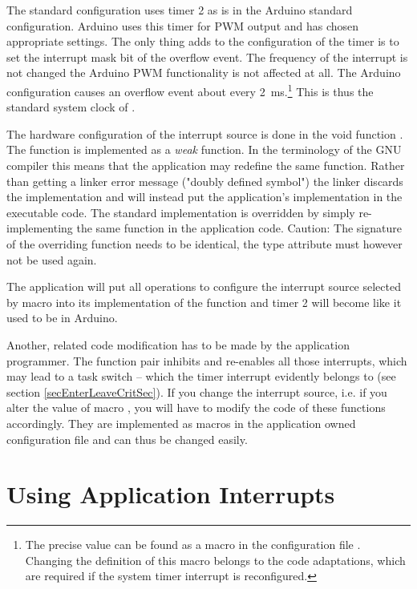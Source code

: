 The \rtos{} standard configuration uses timer 2 as is in the Arduino
standard configuration. Arduino uses this timer for PWM output and has
chosen appropriate settings. The only thing \rtos{} adds to the
configuration of the timer is to set the interrupt mask bit of the
overflow event. The frequency of the interrupt is not changed the Arduino
PWM functionality is not affected at all. The Arduino configuration causes
an overflow event about every 2~ms.\footnote{The precise value can be
found as a macro in the \rtos{} configuration file .
Changing the definition of this macro belongs to the code adaptations,
which are required if the system timer interrupt is reconfigured.} This is
thus the standard system clock of \rtos{}.

The hardware configuration of the interrupt source is done in the void
function . The function is
implemented as a \emph{weak} function. In the terminology of the GNU
compiler this means that the application may redefine the same function.
Rather than getting a linker error message ("doubly defined symbol") the
linker discards the \rtos{} implementation and will instead put the
application's implementation in the executable code. The standard
implementation is overridden by simply re-implementing the same function
in the application code. Caution: The signature of the overriding function
needs to be identical, the type attribute  must however not be
used again.

The application will put all operations to configure the interrupt source
selected by macro  into its
implementation of the function and timer 2 will become like it used to be
in Arduino.

Another, related code modification has to be made by the application
programmer. The function pair
 inhibits and
re-enables all those interrupts, which may lead to a task switch -- which
the timer interrupt evidently belongs to (see section
\ref{secEnterLeaveCritSec}). If you change the interrupt source, i.e. if
you alter the value of macro , you
will have to modify the code of these functions accordingly. They are
implemented as macros in the application owned configuration file
 and can thus be changed easily.


\section{Using Application Interrupts}

